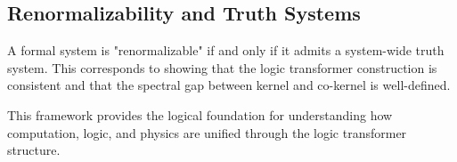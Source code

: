 \subsection{Renormalizability and Truth Systems}

\begin{theorem}
\label{thm:renorm-truth}
A formal system is "renormalizable" if and only if it admits a system-wide truth system. This corresponds to showing that the logic transformer construction is consistent and that the spectral gap between kernel and co-kernel is well-defined.
\end{theorem}

This framework provides the logical foundation for understanding how computation, logic, and physics are unified through the logic transformer structure.
